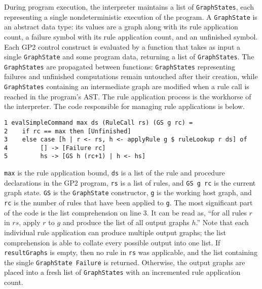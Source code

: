 During program execution, the interpreter maintains a list of \texttt{GraphStates}, each representing a single nondeterministic execution of the program. A \texttt{GraphState} is an abstract data type: its values are a graph along with its rule application count, a failure symbol with its rule application count, and an unfinished symbol. Each GP2 control construct is evaluated by a function that takes as input a single \texttt{GraphState} and some program data, returning a list of \texttt{GraphStates}. The \texttt{GraphStates} are propagated between functions: \texttt{GraphStates} representing failures and unfinished computations remain untouched after their creation, while \texttt{GraphStates} containing an intermediate graph are modified when a rule call is reached in the program's AST. The rule application process is the workhorse of the interpreter. The code responsible for managing rule applications is below.

\begin{verbatim}
1 evalSimpleCommand max ds (RuleCall rs) (GS g rc) = 
2    if rc == max then [Unfinished]
3    else case [h | r <- rs, h <- applyRule g $ ruleLookup r ds] of
4         [] -> [Failure rc]
5         hs -> [GS h (rc+1) | h <- hs]
\end{verbatim}

\texttt{max} is the rule application bound, \texttt{ds} is a list of the rule and procedure declarations in the GP2 program, \texttt{rs} is a list of rules, and \texttt{GS g rc} is the current graph state. \texttt{GS} is the \texttt{GraphState} constructor, \texttt{g} is the working host graph, and \texttt{rc} is the number of rules that have been applied to \texttt{g}. The most significant part of the code is the list comprehension on line 3. It can be read as, ``for all rules $r$ in $rs$, apply $r$ to $g$ and produce the list of all output graphs $h$.'' Note that each individual rule application can produce multiple output graphs; the list comprehension is able to collate every possible output into one list. If \texttt{resultGraphs} is empty, then no rule in \texttt{rs} was applicable, and the list containing the single \texttt{GraphState Failure} is returned. Otherwise, the output graphs are placed into a fresh list of \texttt{GraphStates} with an incremented rule application count.

